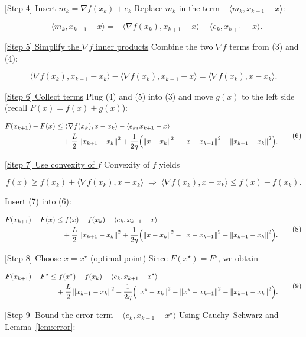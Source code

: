 \documentclass{article}
\newcommand{\norm}[1]{\left\lVert #1\right\rVert}
\newcommand{\inner}[2]{\langle #1,#2\rangle}
\newcommand{\grad}{\nabla}
\begin{document}
\noindent\underline{[Step 4] Insert $m_k=\grad f(x_k)+e_k$}  
Replace $m_k$ in the term $-\inner{m_k}{x_{k+1}-x}$:

\[
-\inner{m_k}{x_{k+1}-x}
= -\inner{\grad f(x_k)}{x_{k+1}-x}
-\inner{e_k}{x_{k+1}-x}.
\tag{4}
\]

\noindent\underline{[Step 5] Simplify the $\grad f$ inner products}  
Combine the two $\grad f$ terms from (3) and (4):

\[
\inner{\grad f(x_k)}{x_{k+1}-x_k}
-\inner{\grad f(x_k)}{x_{k+1}-x}
= \inner{\grad f(x_k)}{x - x_k}.
\tag{5}
\]

\noindent\underline{[Step 6] Collect terms}  
Plug (4) and (5) into (3) and move $g(x)$ to the left side (recall $F(x)=f(x)+g(x)$):

\[
\begin{aligned}
F(x_{k+1})-F(x)
&\le \inner{\grad f(x_k)}{x-x_k}
-\inner{e_k}{x_{k+1}-x}
\\
&\quad+\frac{L}{2}\norm{x_{k+1}-x_k}^{2}
+\frac{1}{2\eta}\Bigl(\norm{x-x_k}^{2}
-\norm{x-x_{k+1}}^{2}
-\norm{x_{k+1}-x_k}^{2}\Bigr).
\end{aligned}
\tag{6}
\]

\noindent\underline{[Step 7] Use convexity of $f$}  
Convexity of $f$ yields  

\[
f(x)\ge f(x_k)+\inner{\grad f(x_k)}{x-x_k}\;\Longrightarrow\;
\inner{\grad f(x_k)}{x-x_k}\le f(x)-f(x_k).
\tag{7}
\]

Insert (7) into (6):

\[
\begin{aligned}
F(x_{k+1})-F(x)
&\le f(x)-f(x_k)
-\inner{e_k}{x_{k+1}-x}
\\
&\quad+\frac{L}{2}\norm{x_{k+1}-x_k}^{2}
+\frac{1}{2\eta}\Bigl(\norm{x-x_k}^{2}
-\norm{x-x_{k+1}}^{2}
-\norm{x_{k+1}-x_k}^{2}\Bigr).
\end{aligned}
\tag{8}
\]

\noindent\underline{[Step 8] Choose $x=x^\star$ (optimal point)}  
Since $F(x^\star)=F^\star$, we obtain  

\[
\begin{aligned}
F(x_{k+1})-F^\star
&\le f(x^\star)-f(x_k)
-\inner{e_k}{x_{k+1}-x^\star}
\\
&\quad+\frac{L}{2}\norm{x_{k+1}-x_k}^{2}
+\frac{1}{2\eta}\Bigl(\norm{x^\star-x_k}^{2}
-\norm{x^\star-x_{k+1}}^{2}
-\norm{x_{k+1}-x_k}^{2}\Bigr).
\end{aligned}
\tag{9}
\]

\noindent\underline{[Step 9] Bound the error term $-\inner{e_k}{x_{k+1}-x^\star}$}  
Using Cauchy–Schwarz and Lemma~\ref{lem:error}:
\end{document}
